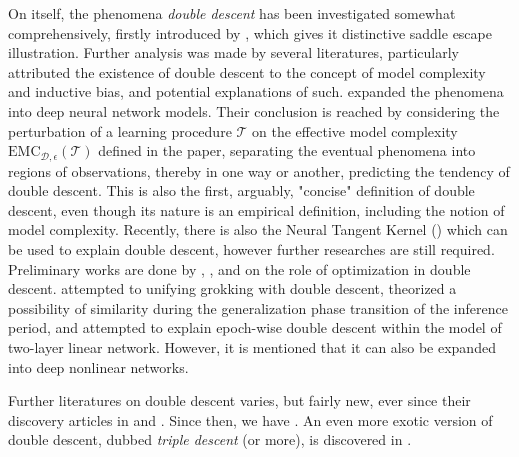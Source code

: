 On itself, the phenomena \textit{double descent} has been investigated somewhat comprehensively, firstly introduced by \cite{belkin_reconciling_2019}, which gives it distinctive saddle escape illustration. Further analysis was made by several literatures, particularly attributed the existence of double descent to the concept of model complexity and inductive bias, and potential explanations of such. \cite{nakkiran_deep_2019} expanded the phenomena into deep neural network models. Their conclusion is reached by considering the perturbation of a learning procedure $\mathcal{T}$ on the effective model complexity $\mathrm{EMC}_{\mathcal{D},\epsilon}(\mathcal{T})$ defined in the paper, separating the eventual phenomena into regions of observations, thereby in one way or another, predicting the tendency of double descent. This is also the first, arguably, "concise" definition of double descent, even though its nature is an empirical definition, including the notion of model complexity. Recently, there is also the Neural Tangent Kernel (\cite{Jacot:2018:NTK}) which can be used to explain double descent, however further researches are still required. Preliminary works are done by \cite{lafon_understanding_2024}, \cite{schaeffer_double_2023}, and \cite{liu2023understandingroleoptimizationdouble} on the role of optimization in double descent. \cite{davies_unifying_2023} attempted to unifying grokking with double descent, theorized a possibility of similarity during the generalization phase transition of the inference period, and \cite{olmin2024understandingepochwisedoubledescent} attempted to explain epoch-wise double descent within the model of two-layer linear network. However, it is mentioned that it can also be expanded into deep nonlinear networks. 

Further literatures on double descent varies, but fairly new, ever since their discovery articles in \cite{belkin_reconciling_2019} and \cite{nakkiran_deep_2019}. Since then, we have \cite{shi2024homophilymodulatesdoubledescent,schaeffer_double_2023,quetu_can_2023,lafon_understanding_2024,neal2019biasvariancetradeofftextbooksneed,davies_unifying_2023,quetu_can_2023-1,liu2023understandingroleoptimizationdouble,mei2020generalizationerrorrandomfeatures,mei2019generalization,adlam2020understandingdoubledescentrequires,transtrum2025egaddoubledescentexplained,liu2021kernelregressionhighdimensions,allerbo2025changingkerneltrainingleads,pezeshki2021multiscalefeaturelearningdynamics,brellmann2024on,nakkiran2019moredata,mei2019randomfeatures,heckel2020early,nakkiran2020regularization,Belkin_2020,Yang_2024,spiess2023doublesingledescentcausal,nakkiran2021optimalregularizationmitigatedouble,zhang2024manipulatingsparsedoubledescent,cherkassky2024understand,nakkiran2019datahurtlinearregression}. An even more exotic version of double descent, dubbed \textit{triple descent} (or more), is discovered in \cite{d_ascoli_triple_2020}. 

